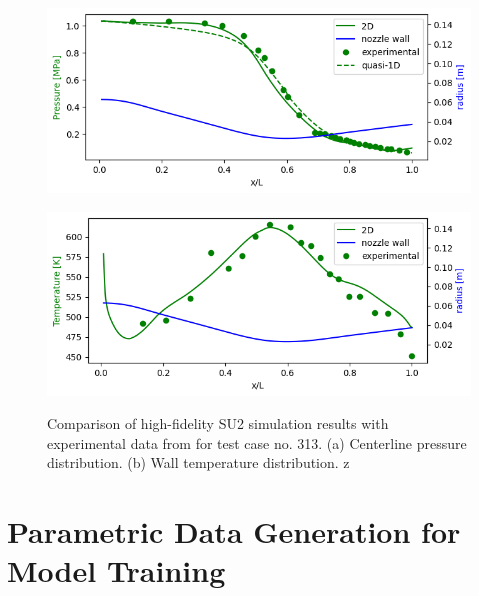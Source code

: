 \documentclass[tg, EN]{ufabcFHZh_tg}
\begin{document}
\begin{figure}[H]
    \centering
    \begin{minipage}[c]{0.9\textwidth}
        \centering
        \includegraphics[width=\textwidth]{Figuras/hf_validation_pressure.png}
        \label{fig:hf_validation_pressure}
    \end{minipage}
    \vspace{1em}
    \begin{minipage}[c]{0.9\textwidth}
        \centering
        \includegraphics[width=\textwidth]{Figuras/hf_validation_temperature.png}
        \label{fig:hf_validation_temperature}
    \end{minipage}
    \caption{Comparison of high-fidelity SU2 simulation results with experimental data from \citep{back1964} for test case no. 313. (a) Centerline pressure distribution. (b) Wall temperature distribution. z}
    \label{fig:hf_validation}
\end{figure}


\section{Parametric Data Generation for Model Training}
\end{document}
